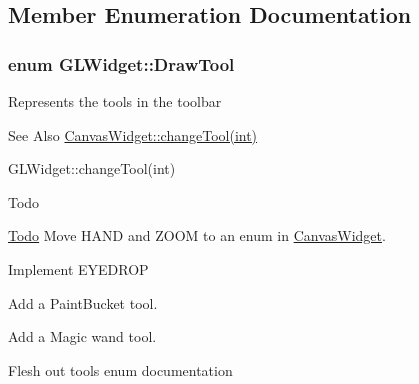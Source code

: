 \subsection{Member Enumeration Documentation}
\hypertarget{classGLWidget_a9fba3eba78950865febd4547be0641d0}{
\subsubsection[{Draw\-Tool}]{\setlength{\rightskip}{0pt plus 5cm}enum {\bf G\-L\-Widget\-::\-Draw\-Tool}}}\label{classGLWidget_a9fba3eba78950865febd4547be0641d0}
Represents the tools in the toolbar \begin{DoxySeeAlso}{See Also}
\hyperlink{classCanvasWidget_a10d481976a36a4e489f42d2b5dfa4662}{Canvas\-Widget\-::change\-Tool(int)} 

G\-L\-Widget\-::change\-Tool(int) 
\end{DoxySeeAlso}
\begin{DoxyRefDesc}{Todo}
\item[\hyperlink{todo__todo000011}{Todo}]Move H\-A\-N\-D and Z\-O\-O\-M to an enum in \hyperlink{classCanvasWidget}{Canvas\-Widget}. 

Implement E\-Y\-E\-D\-R\-O\-P 

Add a Paint\-Bucket tool. 

Add a Magic wand tool. 

Flesh out tools enum documentation \end{DoxyRefDesc}
